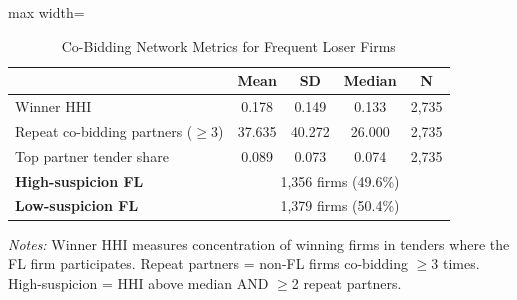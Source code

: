 \begin{table}[htbp]
\centering
\caption{Co-Bidding Network Metrics for Frequent Loser Firms}
\label{tab:fl_network_summary}
\begin{adjustbox}{max width=\textwidth}
\begin{threeparttable}
\small
\begin{tabular}{lcccc}
\toprule
 & Mean & SD & Median & N \\
\midrule
Winner HHI & 0.178 & 0.149 & 0.133 & 2,735 \\
Repeat co-bidding partners ($\geq$3) & 37.635 & 40.272 & 26.000 & 2,735 \\
Top partner tender share & 0.089 & 0.073 & 0.074 & 2,735 \\
\midrule
\textbf{High-suspicion FL} & \multicolumn{4}{c}{1,356 firms (49.6\%)} \\
\textbf{Low-suspicion FL} & \multicolumn{4}{c}{1,379 firms (50.4\%)} \\
\bottomrule
\end{tabular}
\begin{tablenotes}
\small
\item \textit{Notes:} Winner HHI measures concentration of winning firms in tenders
where the FL firm participates. Repeat partners = non-FL firms co-bidding $\geq$3 times.
High-suspicion = HHI above median AND $\geq$2 repeat partners.
\end{tablenotes}
\end{threeparttable}
\end{adjustbox}
\end{table}
